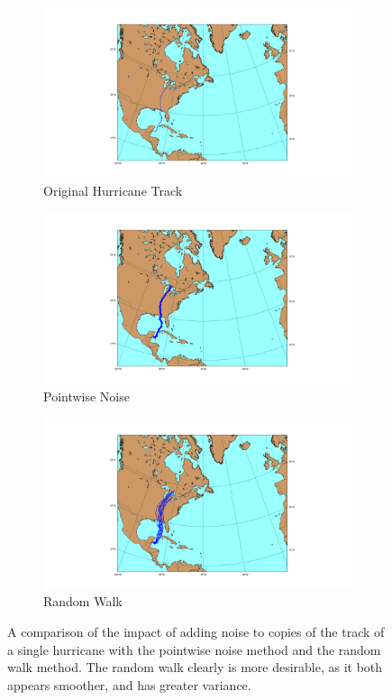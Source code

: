 \begin{figure}
	\centering
	\begin{subfigure}[t]{0.32\textwidth}
		\centering
		\includegraphics[width=\linewidth, trim=350 50 300 50, clip]{images/individual_no_noise.png}
		\caption{Original Hurricane Track}
	\end{subfigure}
	\begin{subfigure}[t]{0.32\textwidth}
		\centering
		\includegraphics[width=\linewidth, trim=350 50 300 50, clip]{images/individual_pointwise.png}
		\caption{Pointwise Noise}
	\end{subfigure}
	\begin{subfigure}[t]{0.32\textwidth}
		\centering
		\includegraphics[width=\linewidth, trim=350 50 300 50, clip]{images/individual_random_walk.png}
		\caption{Random Walk}
	\end{subfigure}
	\caption{A comparison of the impact of adding noise to copies of the track of a single hurricane with the pointwise noise method and the random walk method. The random walk clearly is more desirable, as it both appears smoother, and has greater variance.}
	\label{fig:different_noise}
\end{figure}